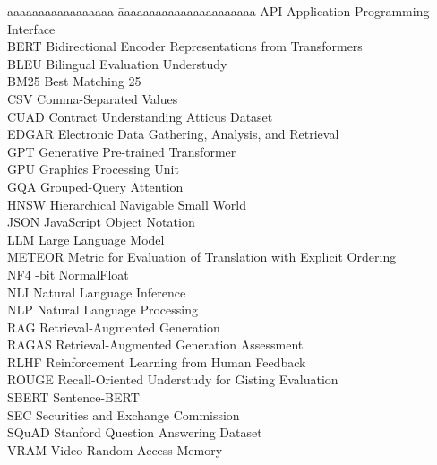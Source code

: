 
\newcommand{\abbrev}[2]{#1 \> #2\\ }
\begin{abbreviations}

\begin{tabbing}
  aaaaaaaaaaaaaaaaa \= aaaaaaaaaaaaaaaaaaaaaa\kill
  \abbrev{API}{Application Programming Interface}
  \abbrev{BERT}{Bidirectional Encoder Representations from Transformers}
  \abbrev{BLEU}{Bilingual Evaluation Understudy}
  \abbrev{BM25}{Best Matching 25}
  \abbrev{CSV}{Comma-Separated Values}
  \abbrev{CUAD}{Contract Understanding Atticus Dataset}
  \abbrev{EDGAR}{Electronic Data Gathering, Analysis, and Retrieval}
  \abbrev{GPT}{Generative Pre-trained Transformer}
  \abbrev{GPU}{Graphics Processing Unit}
  \abbrev{GQA}{Grouped-Query Attention}
  \abbrev{HNSW}{Hierarchical Navigable Small World}
  \abbrev{JSON}{JavaScript Object Notation}
  \abbrev{LLM}{Large Language Model}
  \abbrev{METEOR}{Metric for Evaluation of Translation with Explicit Ordering}
  \abbrev{NF4}{4-bit NormalFloat}
  \abbrev{NLI}{Natural Language Inference}
  \abbrev{NLP}{Natural Language Processing}
  \abbrev{RAG}{Retrieval-Augmented Generation}
  \abbrev{RAGAS}{Retrieval-Augmented Generation Assessment}
  \abbrev{RLHF}{Reinforcement Learning from Human Feedback}
  \abbrev{ROUGE}{Recall-Oriented Understudy for Gisting Evaluation}
  \abbrev{SBERT}{Sentence-BERT}
  \abbrev{SEC}{Securities and Exchange Commission}
  \abbrev{SQuAD}{Stanford Question Answering Dataset}
  \abbrev{VRAM}{Video Random Access Memory}
\end{tabbing}
\end{abbreviations}